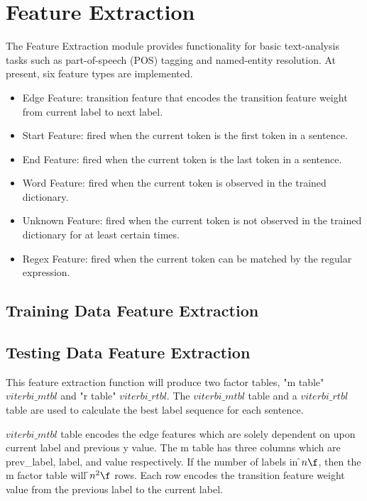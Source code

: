 \section{Feature Extraction}
The Feature Extraction module provides functionality for basic text-analysis
tasks such as part-of-speech (POS) tagging and named-entity resolution.
At present, six feature types are implemented.
    \begin{itemize}
    \item Edge Feature: transition feature that encodes the transition feature weight from current label to next label.
    \item Start Feature: fired when the current token is the first token in a sentence.
    \item End Feature: fired when the current token is the last token in a sentence.
    \item Word Feature: fired when the current token is observed in the trained dictionary.
    \item Unknown Feature: fired when the current token is not observed in the trained dictionary for at least certain times.
    \item Regex Feature: fired when the current token can be matched by the regular expression.
    \end{itemize}

\subsection{Training Data Feature Extraction}

\subsection{Testing Data Feature Extraction}
  This feature extraction function will produce two factor tables, "m table"
  $viterbi\_mtbl$ and "r table" $viterbi\_rtbl$. The $viterbi\_mtbl$
  table and a $viterbi\_rtbl$ table are used to calculate the best label
  sequence for each sentence.
 
  $viterbi\_mtbl$ table
  encodes the edge features which are solely dependent on upon current label and
  previous y value. The m table has three columns which are prev\_label, label,
  and value respectively.
  If the number of labels in \f$ n \f$, then the m factor table will \f$ n^2 \f$
  rows. Each row encodes the transition feature weight value from the previous label
  to the current label.
 
